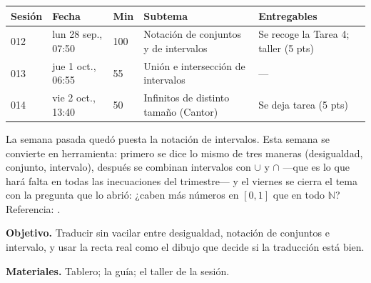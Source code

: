 \documentclass[11pt]{article}
\begin{document}
\encabezado*

\begin{center}
{\renewcommand{\arraystretch}{1.3}
\begin{tabularx}{\linewidth}{@{}l l l X l@{}}
  \toprule
  \textbf{Sesión} & \textbf{Fecha} & \textbf{Min} & \textbf{Subtema} & \textbf{Entregables}\\
  \midrule
  012 & lun 28 sep., 07:50 & 100 & Notación de conjuntos y de intervalos
      & Se recoge la Tarea 4; taller (5 pts)\\
  013 & jue 1 oct., 06:55 & 55 & Unión e intersección de intervalos & ---\\
  014 & vie 2 oct., 13:40 & 50 & Infinitos de distinto tamaño (Cantor) & Se deja tarea (5 pts)\\
  \bottomrule
\end{tabularx}}
\end{center}

La semana pasada quedó puesta la notación de intervalos. Esta semana se convierte en
herramienta: primero se dice lo mismo de tres maneras (desigualdad, conjunto, intervalo),
después se combinan intervalos con $\cup$ y $\cap$ —que es lo que hará falta en todas las
inecuaciones del trimestre— y el viernes se cierra el tema con la pregunta que lo abrió:
¿caben más números en $[0,1]$ que en todo $\mathbb{N}$? Referencia:
.


\textbf{Objetivo.} Traducir sin vacilar entre desigualdad, notación de conjuntos e intervalo,
y usar la recta real como el dibujo que decide si la traducción está bien.

\textbf{Materiales.} Tablero; la guía; el taller de la sesión.
\end{document}
